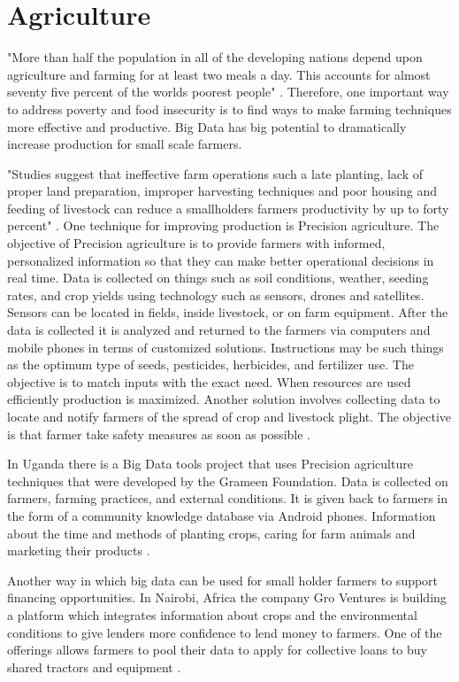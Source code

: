 \documentclass[sigconf]{acmart}
\begin{document}
\section{Agriculture}

"More than half the population in all of the developing nations depend upon agriculture and farming for at least two meals a day. This accounts for almost seventy five percent of the worlds poorest people" \cite{www-google-top10}.  Therefore, one important way to address poverty and food insecurity is to find ways to make farming techniques more effective and productive. Big Data has big potential to dramatically increase production for small scale farmers.

"Studies suggest that ineffective farm operations such a late planting, lack of proper land preparation, improper harvesting techniques and poor housing and feeding of livestock can reduce a smallholders farmers productivity by up to forty percent" \cite{DevEcon}.
One technique for improving production is Precision agriculture. The objective of Precision agriculture is to provide farmers with informed, personalized information so that they can make better operational decisions in real time. Data is collected on things such as soil conditions, weather, seeding rates, and crop yields using technology such as sensors, drones and satellites. Sensors can be located in fields, inside livestock, or on farm equipment.  After the data is collected it is analyzed and returned to the farmers via computers and mobile phones in terms of customized solutions. Instructions may be such things as the optimum type of seeds, pesticides, herbicides, and fertilizer use. The objective is to match inputs with the exact need. When resources are used efficiently production is maximized. Another solution involves collecting data to locate and notify farmers of the spread of crop and livestock plight. The objective is that farmer take safety measures as soon as possible \cite{www-google-Hffpst}.

In Uganda there is a Big Data tools project that uses Precision agriculture techniques that were developed by the Grameen Foundation. Data is collected on farmers, farming practices, and external conditions. It is given back to farmers in the form of a community knowledge database via Android phones. Information about the time and methods of planting crops, caring for farm animals and marketing their products \cite{DevEcon}.

Another way in which big data can be used for small holder farmers to support financing opportunities. In Nairobi, Africa the company Gro Ventures is building a platform which integrates information about crops and the environmental conditions to give lenders more confidence to lend money to farmers. One of the offerings allows farmers to pool their data to apply for collective loans to buy shared tractors and equipment \cite{www-google-Hffpst}.  
\end{document}
